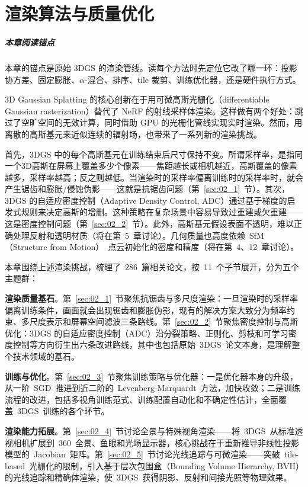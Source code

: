 \chapter{渲染算法与质量优化}
\label{ch:02}

\paragraph*{本章阅读锚点}
本章的锚点是原始 3DGS 的渲染管线。读每个方法时先定位它改了哪一环：投影协方差、固定膨胀、\(\alpha\)-混合、排序、tile 裁剪、训练优化器，还是硬件执行方式。


3D Gaussian Splatting 的核心创新在于用可微高斯光栅化（differentiable Gaussian rasterization）替代了 NeRF 的射线采样体渲染。这样做有两个好处：跳过了空旷空间的无效计算，同时借助 GPU 的光栅化管线实现实时渲染。然而，用离散的高斯基元来近似连续的辐射场，也带来了一系列新的渲染挑战。

首先，3DGS 中的每个高斯基元在训练结束后尺寸保持不变。所谓采样率，是指同一个3D高斯在屏幕上覆盖多少个像素——焦距越长或相机越近，高斯覆盖的像素越多，采样率越高；反之则越低。当渲染时的采样率偏离训练时的采样率时，就会产生锯齿和膨胀/侵蚀伪影——这就是抗锯齿问题（第~\ref{sec:02_1}~节）。其次，3DGS 的自适应密度控制（Adaptive Density Control, ADC）通过基于梯度的启发式规则来决定高斯的增删。这种策略在复杂场景中容易导致过重建或欠重建——这是密度控制问题（第~\ref{sec:02_2}~节）。此外，高斯基元假设表面不透明，难以正确处理反射和透明材质（将在第~5~章讨论）。几何质量也高度依赖~SfM（Structure from Motion）~点云初始化的密度和精度（将在第~4、12~章讨论）。

本章围绕上述渲染挑战，梳理了~286~篇相关论文，按~11~个子节展开，分为五个主题群：

\textbf{渲染质量基石}。第~\ref{sec:02_1}~节聚焦抗锯齿与多尺度渲染：一旦渲染时的采样率偏离训练条件，画面就会出现锯齿和膨胀伪影，现有的解决方案大致分为频率约束、多尺度表示和屏幕空间滤波三条路线。第~\ref{sec:02_2}~节聚焦密度控制与高斯优化：3DGS 的自适应密度控制（ADC）沿分裂策略、正则化、剪枝和可学习密度控制等方向衍生出六条改进路线，其中也包括原始~3DGS~论文本身，是理解整个技术领域的基石。

\textbf{训练与优化}。第~\ref{sec:02_3}~节聚焦训练策略与优化器：一是优化器本身的升级，从一阶~SGD~推进到近二阶的~Levenberg-Marquardt~方法，加快收敛；二是训练流程的改进，包括多视角训练范式、训练配置自动化和不确定性估计，全面覆盖~3DGS~训练的各个环节。

\textbf{渲染能力拓展}。第~\ref{sec:02_4}~节讨论全景与特殊视角渲染——将~3DGS~从标准透视相机扩展到~360\textdegree{}~全景、鱼眼和光场显示器，核心挑战在于重新推导非线性投影模型的~Jacobian~矩阵。第~\ref{sec:02_5}~节讨论光线追踪与可微渲染——突破~tile-based~光栅化的限制，引入基于层次包围盒（Bounding Volume Hierarchy, BVH）的光线追踪和精确体渲染，使~3DGS~获得阴影、反射和间接光照等物理效果。

